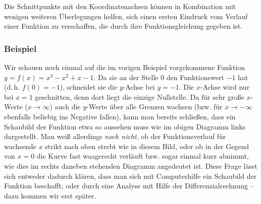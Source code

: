 Die Schnittpunkte mit den Koordinatenachsen können in Kombination mit wenigen weiteren Überlegungen helfen, sich einen ersten Eindruck vom Verlauf einer Funktion zu verschaffen, die durch ihre Funktionsgleichung gegeben ist.

\subsubsection{Beispiel}

\begin{center}
\end{center}

Wir schauen noch einmal auf die im vorigen Beispiel vorgekommene Funktion $y = f(x) = x^3 - x^2 + x - 1$. Da sie an der Stelle 0 den Funktionswert $-1$ hat (d.\,h. $f(0) = -1$), schneidet sie die $y$-Achse bei $y = -1$. Die $x$-Achse wird nur bei $x = 1$ geschnitten, denn dort liegt die einzige Nullstelle. Da für sehr große $x$-Werte ($x \rightarrow \infty$) auch die $y$-Werte über alle Grenzen wachsen (bzw. für $x \rightarrow -\infty$ ebenfalls beliebig ins Negative fallen), kann man bereits schließen, dass ein Schaubild der Funktion etwa so aussehen muss wie im obigen Diagramm links dargestellt. Man weiß allerdings \emph{noch nicht}, ob der Funktionsverlauf für wachsende $x$ strikt nach oben strebt wie in diesem Bild, oder ob in der Gegend von $x = 0$ die Kurve fast waagerecht verläuft bzw. sogar einmal kurz abnimmt, wie dies im rechts daneben stehenden Diagramm angedeutet ist. Diese Frage lässt sich entweder dadurch klären, dass man sich mit Computerhilfe ein Schaubild der Funktion beschafft, oder durch eine Analyse mit Hilfe der Differenzialrechnung -- dazu kommen wir erst später.\beispielende

